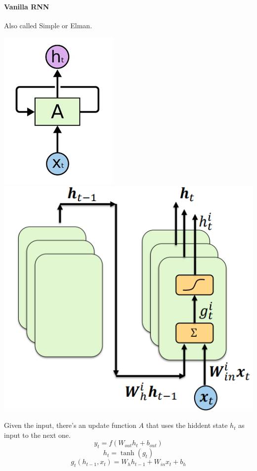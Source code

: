 \documentclass[10pt]{report}
\begin{document}
\paragraph{Vanilla RNN} Also called Simple or Elman.
\begin{center}
	\includegraphics[scale=0.5]{90.png}
	\includegraphics[scale=0.5]{91.png}
\end{center}
Given the input, there's an update function $A$ that uses the hiddent state $h_t$ as input to the next one.
$$y_t = f(W_{out}h_t + b_{out})$$
$$h_t=\tanh(g_t)$$
$$g_t(h_{t-1},x_t) = W_h h_{t-1}+W_{in}x_t + b_h$$
\end{document}
